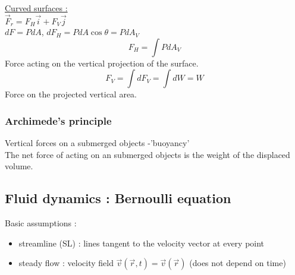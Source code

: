 \documentclass[../main.tex]{subfiles}
\begin{document}
\quad \underline{Curved surfaces :}\\
$\vec{F}_r = F_H \vec{i} + F_V \Vec{j}$\\
$dF = PdA$, $dF_H = PdA \cos{\theta} = PdA_V$\\
\begin{equation}
    F_H = \int PdA_V
\end{equation}
Force acting on the vertical projection of the surface.\\

\begin{equation}
    F_V = \int dF_V = \int dW = W
\end{equation}
Force on the projected vertical area.\\

\subsubsection{Archimede's principle}
Vertical forces on a submerged objects -'buoyancy'\\
The net force of acting on an submerged objects is the weight of the displaced volume.\\

\subsection{Fluid dynamics : Bernoulli equation}
Basic assumptions : \\
\begin{itemize}
    \item streamline (SL) : lines tangent to the velocity vector at every point\\
    \item steady flow : velocity field $\vec{v}(\vec{r}, t) = \vec{v}(\vec{r})$ (does not depend on time)\\
\end{itemize}
\end{document}
